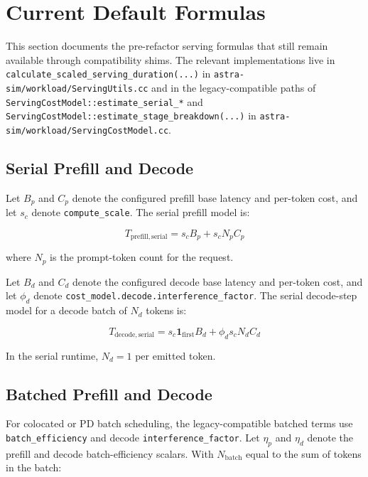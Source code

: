 \section{Current Default Formulas}

This section documents the pre-refactor serving formulas that still remain
available through compatibility shims. The relevant implementations live in
\texttt{calculate\_scaled\_serving\_duration(...)} in
\texttt{astra-sim/workload/ServingUtils.cc} and in the legacy-compatible paths
of \texttt{ServingCostModel::estimate\_serial\_*} and
\texttt{ServingCostModel::estimate\_stage\_breakdown(...)} in
\texttt{astra-sim/workload/ServingCostModel.cc}.

\subsection{Serial Prefill and Decode}

Let \(B_p\) and \(C_p\) denote the configured prefill base latency and per-token
cost, and let \(s_c\) denote \texttt{compute\_scale}. The serial prefill model is:

\begin{equation*}
T_{\mathrm{prefill,serial}} =
s_c B_p + s_c N_p C_p
\end{equation*}

where \(N_p\) is the prompt-token count for the request.

Let \(B_d\) and \(C_d\) denote the configured decode base latency and per-token
cost, and let \(\phi_d\) denote
\texttt{cost\_model.decode.interference\_factor}. The serial decode-step model
for a decode batch of \(N_d\) tokens is:

\begin{equation*}
T_{\mathrm{decode,serial}} =
s_c \mathbf{1}_{\mathrm{first}} B_d + \phi_d s_c N_d C_d
\end{equation*}

In the serial runtime, \(N_d = 1\) per emitted token.

\subsection{Batched Prefill and Decode}

For colocated or PD batch scheduling, the legacy-compatible batched terms use
\texttt{batch\_efficiency} and decode \texttt{interference\_factor}. Let
\(\eta_p\) and \(\eta_d\) denote the prefill and decode batch-efficiency
scalars. With \(N_{\mathrm{batch}}\) equal to the sum of tokens in the batch:

